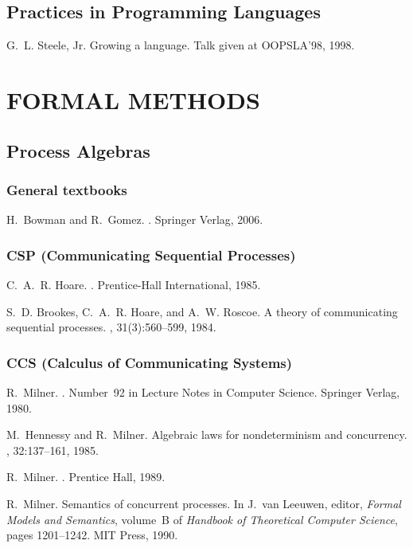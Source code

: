 \documentclass{myproc}
\begin{document}
\eit

\subsection{Practices in Programming Languages}
\bit
\w G.~L. {Steele, Jr.}
\newblock Growing a language.
\newblock Talk given at OOPSLA'98, 1998.
\eit


\section{FORMAL METHODS}
\subsection{Process Algebras}
\subsubsection{General textbooks}
\bit
\w \textcolor{blue2}{H.~Bowman and R.~Gomez.
.
\newblock Springer Verlag, 2006.}
\eit
\subsubsection{CSP (Communicating Sequential Processes)}
\bit
\w C.~A.~R. Hoare.
.
\newblock Prentice-Hall International, 1985.

\w S.~D. Brookes, C.~A.~R. Hoare, and A.~W. Roscoe.
\newblock A theory of communicating sequential processes.
, 31(3):560--599, 1984.
\eit


\subsubsection{CCS (Calculus of Communicating Systems)}
\bit
\w R.~Milner.
.
\newblock Number~92 in Lecture Notes in Computer Science. Springer Verlag,
  1980.

\w M.~Hennessy and R.~Milner.
\newblock Algebraic laws for nondeterminism and concurrency.
, 32:137--161, 1985.

\w R.~Milner.
.
\newblock Prentice Hall, 1989.

\w R.~Milner.
\newblock Semantics of concurrent processes.
\newblock In J.~van Leeuwen, editor, {\em Formal Models and Semantics},
  volume~B of {\em Handbook of Theoretical Computer Science}, pages 1201--1242.
  MIT Press, 1990.
\end{document}

